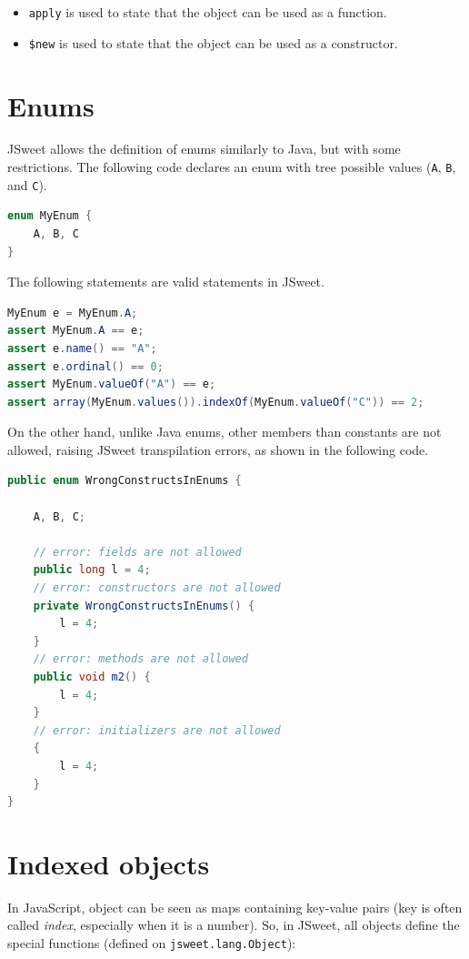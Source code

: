 \documentclass[a4paper]{report}
\begin{document}
\begin{itemize}
\item \texttt{apply} is used to state that the object can be used as a function.
\item \texttt{\$new} is used to state that the object can be used as a constructor.
\end{itemize}

\section{Enums} 

JSweet allows the definition of enums similarly to Java, but with some restrictions. The following code declares an enum with tree possible values (\texttt{A}, \texttt{B}, and \texttt{C}).

\begin{lstlisting}[language=Java]
enum MyEnum {
	A, B, C
}
\end{lstlisting}

The following statements are valid statements in JSweet.

\begin{lstlisting}[language=Java]
MyEnum e = MyEnum.A;
assert MyEnum.A == e;
assert e.name() == "A";
assert e.ordinal() == 0;
assert MyEnum.valueOf("A") == e;
assert array(MyEnum.values()).indexOf(MyEnum.valueOf("C")) == 2;
\end{lstlisting}

On the other hand, unlike Java enums, other members than constants are not allowed, raising JSweet transpilation errors, as shown in the following code.

\begin{lstlisting}[language=Java]
public enum WrongConstructsInEnums {

	A, B, C;
	
	// error: fields are not allowed
	public long l = 4;
	// error: constructors are not allowed	
	private WrongConstructsInEnums() {
		l = 4;
	}
	// error: methods are not allowed
	public void m2() {
		l = 4;
	}
	// error: initializers are not allowed
	{
		l = 4;
	}
}
\end{lstlisting}

\section{Indexed objects}

In JavaScript, object can be seen as maps containing key-value pairs (key is often called \emph{index}, especially when it is a number). So, in JSweet, all objects define the special functions (defined on \texttt{jsweet.lang.Object}):
\end{document}
